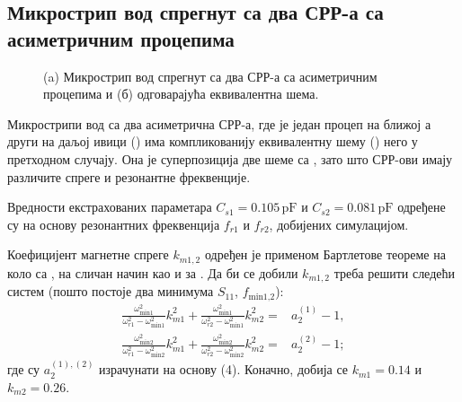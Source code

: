 \subsection{\label{sec:ML2SP}
Микрострип вод спрегнут са два СРР-а са асиметричним процепима}
\begin{figure}[!t]
\caption{(a) Микрострип вод спрегнут са два СРР-а са асиметричним процепима и (б) одговарајућа еквивалентна шема.}
\label{f6}
\end{figure}
Микрострипи вод са два асиметрична СРР-а, где је један процеп на ближој а други на даљој ивици () има компликованију еквивалентну шему () него у претходном случају. Она је суперпозиција две шеме са , зато што СРР-ови имају различите спреге и резонантне фреквенције. 

Вредности екстрахованих параметара $C_{s1}=\num{0.105}\, \mathrm{pF}$ и $C_{s2}=\num{0.081}\,
\mathrm{pF}$ одређене су на основу резонантних фреквенција $f_{r1}$ и $f_{r2}$, добијених симулацијом.

Коефицијент магнетне спреге $k_{m1,2}$  одређен је применом Бартлетове теореме на коло са , на сличан начин као и за . Да би се добили $k_{m1,2}$ треба решити следећи систем (пошто постоје два минимума $S_{11}$, $f_\text{min1,2}$):
\begin{equation}
\begin{split}
\frac{\omega_\text{min1}^2}{\omega_{r1}^2-\omega_\text{min1}^2}k_{m1}^2 +
\frac{\omega_\text{min1}^2}{\omega_{r2}^2-\omega_\text{min1}^2}k_{m2}^2 = & a_2^{(1)} -1, \\
\frac{\omega_\text{min2}^2}{\omega_{r1}^2-\omega_\text{min2}^2}k_{m1}^2 +
\frac{\omega_\text{min2}^2}{\omega_{r2}^2-\omega_\text{min2}^2}k_{m2}^2 = & a_2^{(2)} -1;
\end{split}
\end{equation}
где су $a_2^{(1),(2)}$ израчунати на основу (4). Коначно, добија се $k_{m1}=\num{0.14}$ и $k_{m2}=\num{0.26}$.

